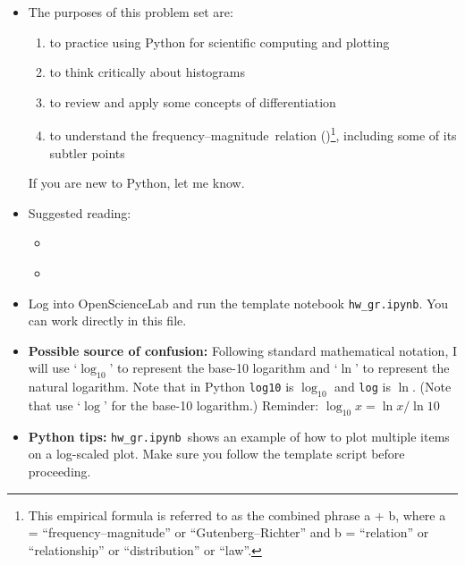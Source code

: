 \documentclass[11pt,titlepage,fleqn]{article}
\newcommand{\tfile}{{\tt hw\_gr.ipynb}}
\newcommand{\fmag}{frequency--magnitude}
\begin{document}
\begin{itemize}

\item The purposes of this problem set are:
%
\begin{enumerate}
\item to practice using Python for scientific computing and plotting
\item to think critically about histograms
\item to review and apply some concepts of differentiation
\item to understand the \fmag\ relation ()\footnote{This empirical formula is referred to as the combined phrase a + b, where a = ``\fmag'' or ``Gutenberg--Richter'' and b = ``relation'' or ``relationship'' or ``distribution'' or ``law''.}, including some of its subtler points
\end{enumerate}
%
If you are new to Python, let me know.

\item Suggested reading:
\begin{itemize}
\item \citet[][Section 4.7.1]{SteinWysession}
\item \citet{GutenbergRichter1944}
\end{itemize}


\item Log into OpenScienceLab and run the template notebook \tfile. You can work directly in this file.

\item {\bf Possible source of confusion:} Following standard mathematical notation, I will use `$\log_{10}$' to represent the base-10 logarithm and `$\ln$' to represent the natural logarithm. Note that in Python \verb+log10+ is $\log_{10}$ and \verb+log+ is $\ln$. (Note that \citet{SteinWysession} use `$\log$' for the base-10 logarithm.) Reminder: $\log_{10} x = \ln x / \ln 10$

\item {\bf Python tips:}
\tfile\ shows an example of how to plot multiple items on a log-scaled plot.
Make sure you follow the template script before proceeding.


\end{itemize}
\end{document}
